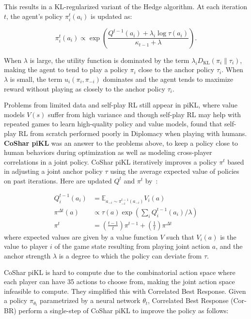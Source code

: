 \documentclass[oneside]{memoir}
\begin{document}
This results in a KL-regularized variant of the Hedge algorithm. At each iteration $t$, the agent's policy $\pi_i^t(a_i)$ is updated as:

\[
\pi_i^t(a_i) \propto \exp\left( \frac{Q^{t-1}(a_i) + \lambda_i \log \tau(a_i)}{\kappa_{t-1} + \lambda} \right).
\]

When $\lambda$ is large, the utility function is dominated by the term $\lambda_i D_{\mathrm{KL}}(\pi_i \parallel \tau_i)$, making the agent to tend to play a policy $\pi_i$ close to the anchor policy $\tau_i$. When $\lambda$ is small, the term $u_i(\pi_i, \pi_{-i})$ dominates and the agent tends to maximize reward without playing as closely to the anchor policy $\tau_i$.
 
Problems from limited data and self-play RL still appear in piKL, where value models $V(s)$ suffer from high variance and though self-play RL may help with repeated games to learn high-quality policy and value models, \cite{bakhtin2021nopress} found that self-play RL from scratch performed poorly in Diplomacy when playing with humans. \textbf{CoShar piKL} was an answer to the problems above, to keep a policy close to human behaviors during optimization as well as modeling cross-player correlations in a joint policy. CoShar piKL iteratively improves a policy $\pi^t$ based in adjusting a joint anchor policy $\tau$ using the average expected value of policies on past iterations. Here are updated $Q^t$ and $\pi^t$ by~\cite{bakhtin2021nopress}:

\begin{align}
    Q^{t-1}_i(a_i) &= \mathbb{E}_{a_{-i} \sim \pi^{t-1}_{-i}(a_{-i})} V_i(a)  \\
    \pi^{\Delta t}(a) &\propto \tau(a) \exp\left( \sum_i Q^{t-1}_i(a_i)/\lambda \right)  \\
    \pi^t &= \left(\frac{t-1}{t}\right)\pi^{t-1} + \left(\frac{1}{t}\right)\pi^{\Delta t}
\end{align}
where expected values are given by a value function $V$ such that $V_i(a)$ is the value to player $i$ of the game state resulting from playing joint action $a$, and the anchor strength $\lambda$ is a degree to which the policy can deviate from $\tau$.

CoShar piKL is hard to compute due to the combinatorial action space where each player can have 35 actions to choose from, making the joint action space infeasible to compute. They simplified this with Correlated Best Response. Given a policy $\pi_{\theta_t}$ parametrized by a neural network $\theta_t$, Correlated Best Response (Cor-BR) perform a single-step of CoShar piKL to improve the policy as follows:
\end{document}

